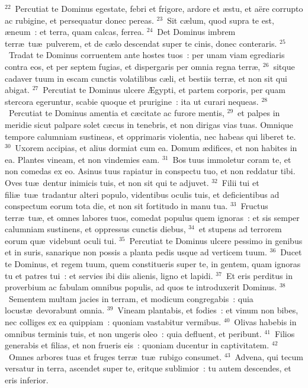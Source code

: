 ${}^{22}$~Percutiat te Dominus egestate, febri et frigore, ardore et \ae stu, et a\"ere corrupto ac rubigine, et persequatur donec pereas.
${}^{23}$~Sit c\ae lum, quod supra te est, \ae neum~: et terra, quam calcas, ferrea.
${}^{24}$~Det Dominus imbrem terr\ae\ tu\ae\ pulverem, et de c\ae lo descendat super te cinis, donec conteraris.
${}^{25}$~Tradat te Dominus corruentem ante hostes tuos~: per unam viam egrediaris contra eos, et per septem fugias, et dispergaris per omnia regna terr\ae ,
${}^{26}$~sitque cadaver tuum in escam cunctis volatilibus c\ae li, et bestiis terr\ae , et non sit qui abigat.
${}^{27}$~Percutiat te Dominus ulcere \AE gypti, et partem corporis, per quam stercora egeruntur, scabie quoque et prurigine~: ita ut curari nequeas.
${}^{28}$~Percutiat te Dominus amentia et c\ae citate ac furore mentis,
${}^{29}$~et palpes in meridie sicut palpare solet c\ae cus in tenebris, et non dirigas vias tuas. Omnique tempore calumniam sustineas, et opprimaris violentia, nec habeas qui liberet te.
${}^{30}$~Uxorem accipias, et alius dormiat cum ea. Domum \ae difices, et non habites in ea. Plantes vineam, et non vindemies eam.
${}^{31}$~Bos tuus immoletur coram te, et non comedas ex eo. Asinus tuus rapiatur in conspectu tuo, et non reddatur tibi. Oves tu\ae\ dentur inimicis tuis, et non sit qui te adjuvet.
${}^{32}$~Filii tui et fili\ae\ tu\ae\ tradantur alteri populo, videntibus oculis tuis, et deficientibus ad conspectum eorum tota die, et non sit fortitudo in manu tua.
${}^{33}$~Fructus terr\ae\ tu\ae , et omnes labores tuos, comedat populus quem ignoras~: et sis semper calumniam sustinens, et oppressus cunctis diebus,
${}^{34}$~et stupens ad terrorem eorum qu\ae\ videbunt oculi tui.
${}^{35}$~Percutiat te Dominus ulcere pessimo in genibus et in suris, sanarique non possis a planta pedis usque ad verticem tuum.
${}^{36}$~Ducet te Dominus, et regem tuum, quem constitueris super te, in gentem, quam ignoras tu et patres tui~: et servies ibi diis alienis, ligno et lapidi.
${}^{37}$~Et eris perditus in proverbium ac fabulam omnibus populis, ad quos te introduxerit Dominus.
${}^{38}$~Sementem multam jacies in terram, et modicum congregabis~: quia locust\ae\ devorabunt omnia.
${}^{39}$~Vineam plantabis, et fodies~: et vinum non bibes, nec colliges ex ea quippiam~: quoniam vastabitur vermibus.
${}^{40}$~Olivas habebis in omnibus terminis tuis, et non ungeris oleo~: quia defluent, et peribunt.
${}^{41}$~Filios generabis et filias, et non frueris eis~: quoniam ducentur in captivitatem.
${}^{42}$~Omnes arbores tuas et fruges terr\ae\ tu\ae\ rubigo consumet.
${}^{43}$~Advena, qui tecum versatur in terra, ascendet super te, eritque sublimior~: tu autem descendes, et eris inferior.
